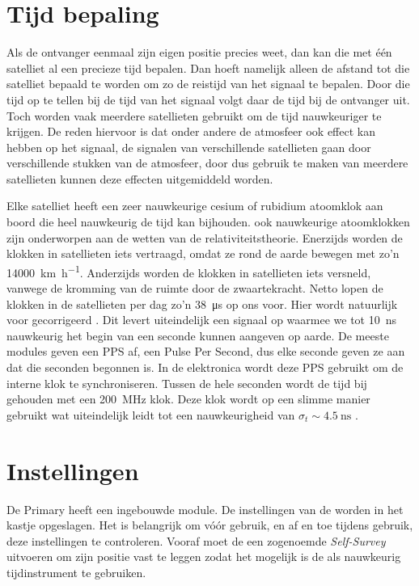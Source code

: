 \section{Tijd bepaling}

Als de ontvanger eenmaal zijn eigen positie precies weet, dan kan die
met één satelliet al een precieze tijd bepalen. Dan hoeft namelijk
alleen de afstand tot die satelliet bepaald te worden om zo de reistijd
van het signaal te bepalen. Door die tijd op te tellen bij de tijd van
het signaal volgt daar de tijd bij de ontvanger uit. Toch worden vaak
meerdere satellieten gebruikt om de tijd nauwkeuriger te krijgen. De
reden hiervoor is dat onder andere de atmosfeer ook effect kan hebben op
het signaal, de signalen van verschillende satellieten gaan door
verschillende stukken van de atmosfeer, door dus gebruik te maken van
meerdere satellieten kunnen deze effecten uitgemiddeld worden.

Elke \gps satelliet heeft een zeer nauwkeurige cesium of rubidium
atoomklok aan boord die heel nauwkeurig de tijd kan bijhouden. ook
nauwkeurige atoomklokken zijn onderworpen aan de wetten van de
relativiteitstheorie. Enerzijds worden de klokken in \gps satellieten
iets vertraagd, omdat ze rond de aarde bewegen met zo'n
\SI{14000}{\kilo\meter\per\hour}. Anderzijds worden de klokken in \gps
satellieten iets versneld, vanwege de kromming van de ruimte door de
zwaartekracht. Netto lopen de klokken in de \gps satellieten per dag
zo'n \SI{38}{\micro\second} op ons voor. Hier wordt natuurlijk voor
gecorrigeerd \cite{ashby1997gen}. Dit levert uiteindelijk een signaal op
waarmee we tot \SI{10}{\nano\second} nauwkeurig het begin van een
seconde kunnen aangeven op aarde. De meeste \gps modules geven een PPS
af, een Pulse Per Second, dus elke seconde geven ze aan dat die seconden
begonnen is. In de \hisparc elektronica wordt deze PPS gebruikt om de
interne klok te synchroniseren. Tussen de hele seconden wordt de tijd
bij gehouden met een \SI{200}{\mega\hertz} klok. Deze klok wordt op een
slimme manier gebruikt wat uiteindelijk leidt tot een nauwkeurigheid van
$\sigma_t\sim\SI{4.5}{\nano\second}$ \cite{trimble2007res}.


\section{Instellingen}

De \hisparc Primary heeft een ingebouwde \gps module. De instellingen van
de \gps worden in het kastje opgeslagen. Het is belangrijk om vóór gebruik, en af
en toe tijdens gebruik, deze instellingen te controleren. Vooraf moet de
\gps een zogenoemde \emph{Self-Survey} uitvoeren om zijn positie vast te
leggen zodat het mogelijk is de \gps als nauwkeurig tijdinstrument te
gebruiken.

